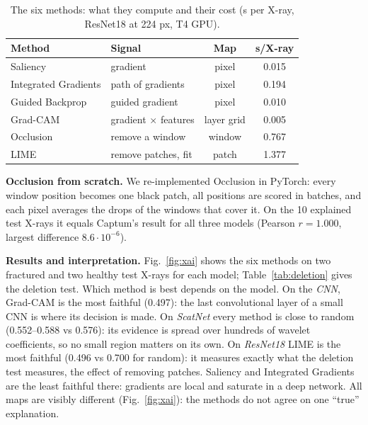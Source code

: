 \documentclass[conference]{IEEEtran}
\begin{document}
\begin{table}[t]
\centering
\caption{The six methods: what they compute and their cost (s per X-ray, ResNet18 at 224 px, T4 GPU).}
\label{tab:xaimethods}
\renewcommand{\arraystretch}{1.1}
\setlength{\tabcolsep}{3pt}
\begin{tabular}{llcc}
\toprule
Method & Signal & Map & s/X-ray \\
\midrule
Saliency             & gradient           & pixel  & 0.015 \\
Integrated Gradients & path of gradients  & pixel  & 0.194 \\
Guided Backprop      & guided gradient    & pixel  & 0.010 \\
Grad-CAM             & gradient $\times$ features & layer grid & 0.005 \\
Occlusion            & remove a window    & window & 0.767 \\
LIME                 & remove patches, fit & patch  & 1.377 \\
\bottomrule
\end{tabular}
\end{table}

\textbf{Occlusion from scratch.} We re-implemented Occlusion in PyTorch: every window position becomes one black
patch, all positions are scored in batches, and each pixel averages the drops of the windows that cover it. On the 10
explained test X-rays it equals Captum's result for all three models (Pearson $r=1.000$, largest difference
$8.6\cdot10^{-6}$).

\textbf{Results and interpretation.} Fig.~\ref{fig:xai} shows the six methods on two fractured and two healthy test
X-rays for each model; Table~\ref{tab:deletion} gives the deletion test. Which method is best depends on the model.
On the \emph{CNN}, Grad-CAM is the most faithful (0.497): the last convolutional layer of a small CNN is where its
decision is made. On \emph{ScatNet} every method is close to random (0.552--0.588 vs 0.576): its evidence is spread
over hundreds of wavelet coefficients, so no small region matters on its own. On \emph{ResNet18} LIME is the most
faithful (0.496 vs 0.700 for random): it measures exactly what the deletion test measures, the effect of removing
patches. Saliency and Integrated Gradients are the least faithful there: gradients are local and saturate in a deep
network. All maps are visibly different (Fig.~\ref{fig:xai}): the methods do not agree on one ``true'' explanation.
\end{document}
